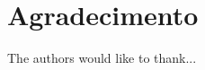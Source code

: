 \documentclass[conference]{IEEEtran}
\begin{document}
%







\section*{Agradecimento}


The authors would like to thank...





\end{document}
